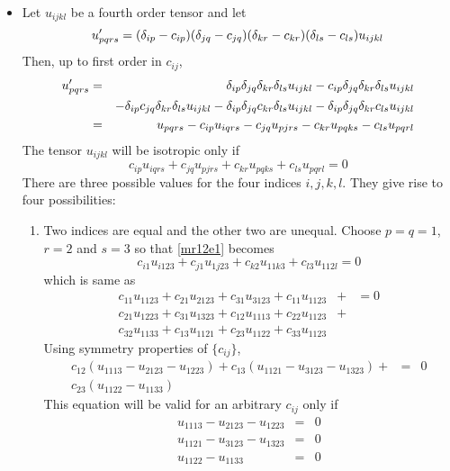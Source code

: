 \begin{itemize}
\item Let $u_{ijkl}$ be a fourth order tensor and let
\[
u_{pqrs}^\prime = (\delta_{ip} - c_{ip})(\delta_{jq} - c_{jq})(\delta_{kr} - c_{kr})(\delta_{ls} - c_{ls})u_{ijkl}
\]
Then, up to first order in $c_{ij}$,
\begin{eqnarray*}
u_{pqrs}^\prime &=& \delta_{ip}\delta_{jq}\delta_{kr}\delta_{ls}u_{ijkl} - c_{ip}\delta_{jq}\delta_{kr}\delta_{ls}u_{ijkl} \\
 & & - \delta_{ip}c_{jq}\delta_{kr}\delta_{ls}u_{ijkl} - \delta_{ip}\delta_{jq}c_{kr}\delta_{ls}u_{ijkl} -\delta_{ip}\delta_{jq}\delta_{kr}c_{ls}u_{ijkl} \\
 &=& u_{pqrs} - c_{ip}u_{iqrs} - c_{jq}u_{pjrs} - c_{kr}u_{pqks} - c_{ls}u_{pqrl}
\end{eqnarray*}
The tensor $u_{ijkl}$ will be isotropic only if
\begin{equation}\label{mr12e1}
c_{ip}u_{iqrs} + c_{jq}u_{pjrs} + c_{kr}u_{pqks} + c_{ls}u_{pqrl} = 0
\end{equation}
There are three possible values for the four indices $i, j, k, l$. They give rise to four possibilities:
\begin{enumerate}
\item Two indices are equal and the other two are unequal. Choose $p = q = 1$, $r = 2$ and $s = 3$ so that \eqref{mr12e1} becomes
\[
c_{i1}u_{i123} + c_{j1}u_{1j23} + c_{k2}u_{11k3} + c_{l3}u_{112l} = 0
\]
which is same as
\begin{eqnarray*}
c_{11}u_{1123} + c_{21}u_{2123} + c_{31}u_{3123} + c_{11}u_{1123} &+& = 0 \\ 
c_{21}u_{1223} + c_{31}u_{1323} + c_{12}u_{1113} + c_{22}u_{1123} &+& \\
c_{32}u_{1133} + c_{13}u_{1121} + c_{23}u_{1122} + c_{33}u_{1123} & &
\end{eqnarray*}
Using symmetry properties of $\{c_{ij}\}$,
\begin{eqnarray*}
c_{12}(u_{1113} - u_{2123} - u_{1223}) + c_{13}(u_{1121} - u_{3123} - u_{1323}) + &=& 0 \\
c_{23}(u_{1122} - u_{1133}) & &
\end{eqnarray*}
This equation will be valid for an arbitrary $c_{ij}$ only if
\begin{eqnarray}
u_{1113} - u_{2123} - u_{1223} &=& 0 \label{mr12e2} \\
u_{1121} - u_{3123} - u_{1323} &=& 0 \label{mr12e3} \\
u_{1122} - u_{1133} &=& 0 \label{mr12e4}
\end{eqnarray}

\end{enumerate}
\end{itemize}
